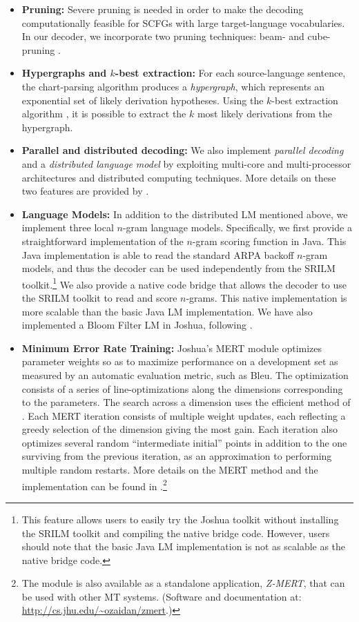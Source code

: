 \documentclass[11pt]{article}
\begin{document}
\begin{itemize}
\item \textbf{Pruning:} Severe pruning is needed in order to make the decoding computationally feasible for SCFGs with large target-language vocabularies. In our decoder, we incorporate two pruning techniques: beam- and cube-pruning \cite{Chiang2007}.

\item \textbf{Hypergraphs and $k$-best extraction:}
For each source-language sentence, the chart-parsing algorithm produces a \emph{hypergraph}, which represents an exponential set of likely derivation hypotheses. Using the $k$-best extraction algorithm \cite{Huang2005}, it is possible to extract the $k$ most likely derivations from the hypergraph.

\item \textbf{Parallel and distributed decoding:}
We also implement \emph{parallel decoding} and a \emph{distributed language model} by exploiting multi-core and multi-processor architectures and distributed computing techniques. More details on these two features are provided by .

\item \textbf{Language Models:} In addition to the distributed LM mentioned above, we implement three local $n$-gram language models. Specifically, we first provide a straightforward implementation of the $n$-gram scoring function in Java. This Java implementation is able to read the standard ARPA backoff $n$-gram models, and thus the decoder can be used independently from the SRILM toolkit.\footnote{This feature allows users to easily try the Joshua toolkit without installing the SRILM toolkit and compiling the native bridge code. However, users should note that the basic Java LM implementation is not as scalable as the native bridge code.} We also provide a native code bridge that allows the decoder to use the SRILM toolkit to read and score $n$-grams. This native implementation is more scalable than the basic Java LM implementation. We have also implemented a Bloom Filter LM in Joshua, following .

\item \textbf{Minimum Error Rate Training:} Joshua's MERT module optimizes parameter weights so as to maximize performance on a development set as measured by an automatic evaluation metric, such as Bleu. The optimization consists of a series of line-optimizations along the dimensions corresponding to the parameters. The search across a dimension uses the efficient method of . Each MERT iteration consists of multiple weight updates, each reflecting a greedy selection of the dimension giving the most gain. Each iteration also optimizes several random ``intermediate initial'' points in addition to the one surviving from the previous iteration, as an approximation to performing multiple random restarts. More details on the MERT method and the implementation can be found in .\footnote{The module is also available as a standalone application, {\em Z-MERT}, that can be used with other MT systems. (Software and documentation at: \url{http://cs.jhu.edu/~ozaidan/zmert}.)}




\end{itemize}
\end{document}
